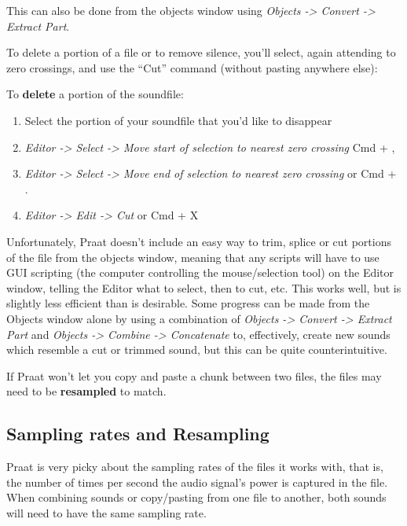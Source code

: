 This can also be done from the objects window using \emph{Objects
-\textgreater{} Convert -\textgreater{} Extract Part}.

To delete a portion of a file or to remove silence, you'll select, again
attending to zero crossings, and use the ``Cut'' command (without
pasting anywhere else):

To \textbf{delete} a portion of the soundfile:

\begin{enumerate}
\def\labelenumi{\arabic{enumi}.}
\tightlist
\item
  Select the portion of your soundfile that you'd like to disappear
\item
  \emph{Editor -\textgreater{} Select -\textgreater{} Move start of
  selection to nearest zero crossing} Cmd + ,
\item
  \emph{Editor -\textgreater{} Select -\textgreater{} Move end of
  selection to nearest zero crossing} or Cmd + .
\item
  \emph{Editor -\textgreater{} Edit -\textgreater{} Cut} or Cmd + X
\end{enumerate}

Unfortunately, Praat doesn't include an easy way to trim, splice or cut
portions of the file from the objects window, meaning that any scripts
will have to use GUI scripting (the computer controlling the
mouse/selection tool) on the Editor window, telling the Editor what to
select, then to cut, etc. This works well, but is slightly less
efficient than is desirable. Some progress can be made from the Objects
window alone by using a combination of \emph{Objects -\textgreater{}
Convert -\textgreater{} Extract Part} and \emph{Objects -\textgreater{}
Combine -\textgreater{} Concatenate} to, effectively, create new sounds
which resemble a cut or trimmed sound, but this can be quite
counterintuitive.

If Praat won't let you copy and paste a chunk between two files, the
files may need to be \textbf{resampled} to match.

\hypertarget{sampling-rates-and-resampling}{%
\subsection{Sampling rates and
Resampling}\label{sampling-rates-and-resampling}}

\label{samplingrate}

Praat is very picky about the sampling rates of the files it works with,
that is, the number of times per second the audio signal's power is
captured in the file. When combining sounds or copy/pasting from one
file to another, both sounds will need to have the same sampling rate.

